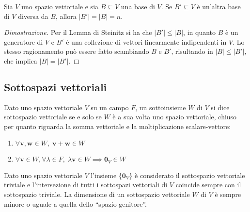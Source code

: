     \vspace{10pt}
    \begin{theorem}
        Sia $V$ uno spazio vettoriale e sia $B \subseteq V$ una base di $V$. Se $B' \subseteq V$ è un'altra base di $V$ diversa da $B$, allora $|B'| = |B| = n$.
    \end{theorem}

    \begin{proof}[Dimostrazione]
       Per il Lemma di Steinitz si ha che $|B'| \leq |B|$, in quanto $B$ è un generatore di $V$ e $B'$ è una collezione di vettori linearmente indipendenti in $V$.
       Lo stesso ragionamento può essere fatto scambiando $B$ e $B'$, risultando in $|B| \leq |B'|$, che implica $|B| = |B'|$.
    \end{proof}



\vspace{10pt}
\subsection{Sottospazi vettoriali} \label{subsec:vssubspaces}
    Dato uno spazio vettoriale $V$ su un campo $F$, un sottoinsieme $W$ di $V$ si dice sottospazio vettoriale se e solo se $W$ è a sua volta uno spazio vettoriale, chiuso per quanto riguarda
    la somma vettoriale e la moltiplicazione scalare-vettore:

    \begin{enumerate}[label=(\arabic*)]
        \item $\forall \mathbf{v}, \mathbf{w} \in W, \; \mathbf{v} + \mathbf{w} \in W$
        \item $\forall \mathbf{v} \in W, \forall \lambda \in F, \; \lambda \mathbf{v} \in W \implies \mathbf{0}_V \in W$
    \end{enumerate}

    Dato uno spazio vettoriale $V$ l'insieme $\{\mathbf{0}_V\}$ è considerato il sottospazio vettoriale triviale e l'intersezione di tutti i sottospazi
    vettoriali di $V$ coincide sempre con il sottospazio triviale. La dimensione di un sottospazio vettoriale $W$ di $V$ è sempre minore o uguale a quella dello ``spazio genitore''.

